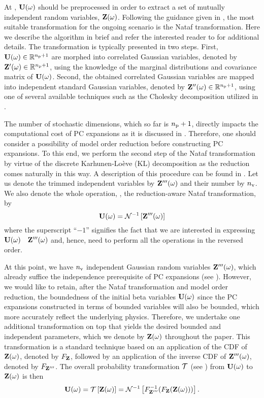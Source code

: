 At , $\mathbf{U}(\omega)$ should be preprocessed in order to extract a set of mutually independent random variables, $\mathbf{Z}(\omega)$.
Following the guidance given in , the most suitable transformation for the ongoing scenario is the Nataf transformation.
Here we describe the algorithm in brief and refer the interested reader to \cite{li2008} for additional details. The transformation is typically presented in two steps.
First, $\mathbf{U}(\omega) \in \mathbb{R}^{{n_\text{p}} + 1}$ are morphed into correlated Gaussian variables, denoted by $\mathbf{Z}'(\omega) \in \mathbb{R}^{{n_\text{p}} + 1}$, using the knowledge of the marginal distributions and covariance matrix of $\mathbf{U}(\omega)$.
Second, the obtained correlated Gaussian variables are mapped into independent standard Gaussian variables, denoted by $\mathbf{Z}''(\omega) \in \mathbb{R}^{{n_\text{p}} + 1}$, using one of several available techniques such as the Cholesky decomposition \cite{press2007} utilized in \cite{li2008}.

The number of stochastic dimensions, which so far is ${n_\text{p}} + 1$, directly impacts the computational cost of PC expansions as it is discussed in .
Therefore, one should consider a possibility of model order reduction before constructing PC expansions.
To this end, we perform the second step of the Nataf transformation by virtue of the discrete Karhunen-Lo\`{e}ve (KL) decomposition \cite{ghanem1991} as the reduction comes naturally in this way.
A description of this procedure can be found in .
Let us denote the trimmed independent variables by $\mathbf{Z}'''(\omega)$ and their number by ${n_\text{v}}$.
We also denote the whole operation, \ie, the reduction-aware Nataf transformation, by
\[
  \mathbf{U}(\omega) = \mathcal{N}^{-1}\left[\mathbf{Z}'''(\omega)\right]
\]
where the superscript ``$-1$'' signifies the fact that we are interested in expressing $\mathbf{U}(\omega)$ \via\ $\mathbf{Z}'''(\omega)$ and, hence, need to perform all the operations in the reversed order.

At this point, we have ${n_\text{v}}$ independent Gaussian random variables $\mathbf{Z}'''(\omega)$, which already suffice the independence prerequisite of PC expansions (see ).
However, we would like to retain, after the Nataf transformation and model order reduction, the boundedness of the initial beta variables $\mathbf{U}(\omega)$ since the PC expansions constructed in terms of bounded variables will also be bounded, which more accurately reflect the underlying physics.
Therefore, we undertake one additional transformation on top that yields the desired bounded and independent parameters, which we denote by $\mathbf{Z}(\omega)$ throughout the paper.
This transformation is a standard technique \cite{durrett2010} based on an application of the CDF of $\mathbf{Z}(\omega)$, denoted by $F_{\mathbf{Z}}$, followed by an application of the inverse CDF of $\mathbf{Z}'''(\omega)$, denoted by $F_{\mathbf{Z}'''}$.
The overall probability transformation $\oTransform$ (see ) from $\mathbf{U}(\omega)$ to $\mathbf{Z}(\omega)$ is then
\[
  \vU(\o) = \oTransform{\vZ(\o)} = \oInvNataf{\fCDF^{-1}_{\vZ'''}(\fCDF_{\vZ}(\vZ(\o)))}.
\]

